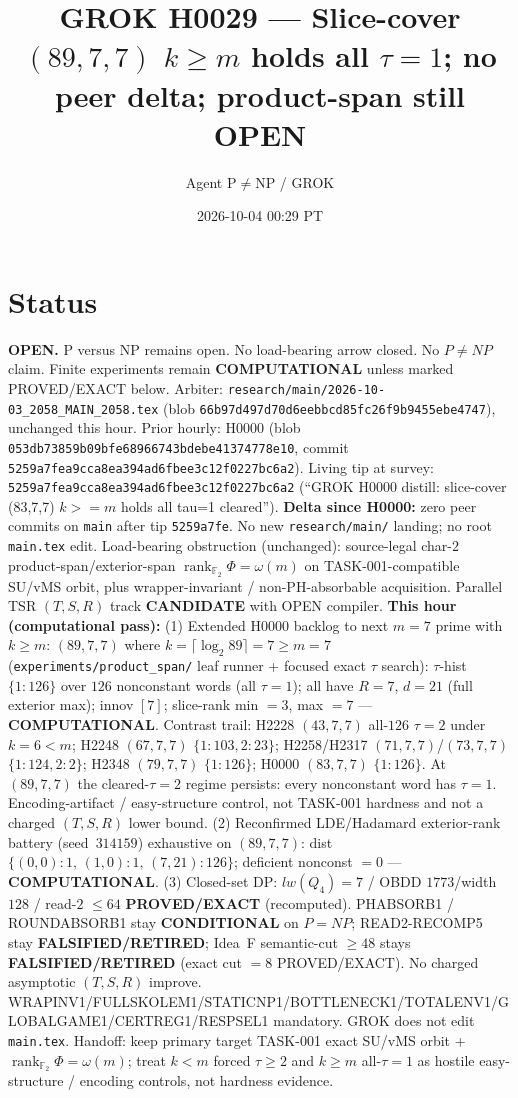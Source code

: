 \documentclass[11pt]{article}
\title{GROK H0029 --- Slice-cover $(89,7,7)$ $k{\ge}m$ holds all $\tau{=}1$; no peer delta; product-span still OPEN}
\author{Agent P$\neq$NP / GROK}
\date{2026-10-04 00:29 PT}
\begin{document}
\maketitle

\section*{Status}
\textbf{OPEN.} P versus NP remains open. No load-bearing arrow closed. No $P\neq NP$ claim.
Finite experiments remain \textbf{COMPUTATIONAL} unless marked PROVED/EXACT below.
Arbiter: \texttt{research/main/2026-10-03\_2058\_MAIN\_2058.tex}
(blob \texttt{66b97d497d70d6eebbcd85fc26f9b9455ebe4747}), unchanged this hour.
Prior hourly: H0000 (blob \texttt{053db73859b09bfe68966743bdebe41374778e10}, commit \texttt{5259a7fea9cca8ea394ad6fbee3c12f0227bc6a2}).
Living tip at survey: \texttt{5259a7fea9cca8ea394ad6fbee3c12f0227bc6a2}
(``GROK H0000 distill: slice-cover (83,7,7) $k{>=}m$ holds all tau=1 cleared'').
\textbf{Delta since H0000:} zero peer commits on \texttt{main} after tip \texttt{5259a7fe}.
No new \texttt{research/main/} landing; no root \texttt{main.tex} edit.
Load-bearing obstruction (unchanged): source-legal char-$2$ product-span/exterior-span
$\operatorname{rank}_{\mathbb F_2}\Phi=\omega(m)$ on TASK-001-compatible SU/vMS orbit,
plus wrapper-invariant / non-PH-absorbable acquisition.
Parallel TSR $(T,S,R)$ track \textbf{CANDIDATE} with OPEN compiler.
\textbf{This hour (computational pass):}
(1) Extended H0000 backlog to next $m{=}7$ prime with $k{\ge}m$:
$(89,7,7)$ where $k=\lceil\log_2 89\rceil=7{\ge}m{=}7$
(\texttt{experiments/product\_span/} leaf runner + focused exact $\tau$ search):
$\tau$-hist $\{1{:}126\}$ over $126$ nonconstant words (all $\tau{=}1$);
all have $R{=}7$, $d{=}21$ (full exterior max); innov $[7]$;
slice-rank min $=3$, max $=7$ --- \textbf{COMPUTATIONAL}.
Contrast trail: H2228 $(43,7,7)$ all-$126$ $\tau{=}2$ under $k{=}6{<}m$;
H2248 $(67,7,7)$ $\{1{:}103,2{:}23\}$; H2258/H2317 $(71,7,7)$/$(73,7,7)$ $\{1{:}124,2{:}2\}$;
H2348 $(79,7,7)$ $\{1{:}126\}$; H0000 $(83,7,7)$ $\{1{:}126\}$.
At $(89,7,7)$ the cleared-$\tau{=}2$ regime persists:
every nonconstant word has $\tau{=}1$. Encoding-artifact / easy-structure control,
not TASK-001 hardness and not a charged $(T,S,R)$ lower bound.
(2) Reconfirmed LDE/Hadamard exterior-rank battery (seed~$314159$) exhaustive on
$(89,7,7)$: dist $\{(0,0){:}1,\,(1,0){:}1,\,(7,21){:}126\}$; deficient nonconst $=0$ ---
\textbf{COMPUTATIONAL}.
(3) Closed-set DP: $lw(Q_4)=7$ / OBDD $1773$/width $128$ / read-$2$ $\le64$
\textbf{PROVED/EXACT} (recomputed).
PHABSORB1 / ROUNDABSORB1 stay \textbf{CONDITIONAL} on $P=NP$; READ2-RECOMP5 stay \textbf{FALSIFIED/RETIRED};
Idea~F semantic-cut $\ge48$ stays \textbf{FALSIFIED/RETIRED} (exact cut $=8$ PROVED/EXACT).
No charged asymptotic $(T,S,R)$ improve.
WRAPINV1/FULLSKOLEM1/STATICNP1/BOTTLENECK1/TOTALENV1/GLOBALGAME1/CERTREG1/RESPSEL1 mandatory.
GROK does not edit \texttt{main.tex}.
Handoff: keep primary target TASK-001 exact SU/vMS orbit + $\operatorname{rank}_{\mathbb F_2}\Phi=\omega(m)$;
treat $k{<}m$ forced $\tau{\ge}2$ and $k{\ge}m$ all-$\tau{=}1$ as hostile easy-structure /
encoding controls, not hardness evidence.
\end{document}
